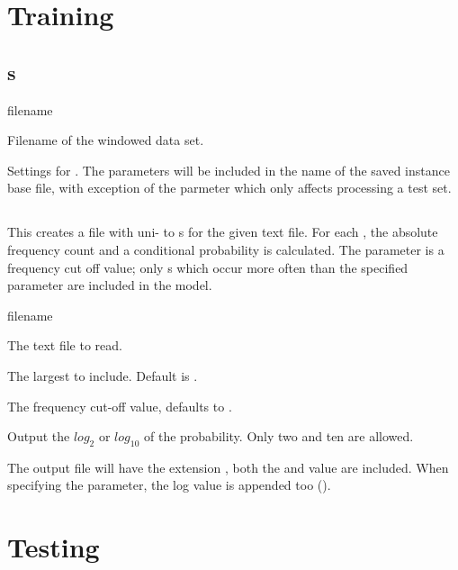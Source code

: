 \documentclass[a4paper,10pt,twoside]{report}
\begin{document}

\section{Training}

\subsection{s}

\begin{varlist}{filename}
\item[filename] Filename of the windowed data set.
\item[timbl] Settings for \Timbl{}. The parameters will be included in
  the name of the saved instance base file, with exception of the
   parmeter which only affects processing a test set.
\end{varlist}

\subsection{}

This creates a file with uni- to \ngram{}s for the given text
file. For each \ngram{}, the absolute frequency count and a
conditional probability is calculated. The  parameter is a
frequency cut off value; only \ngram{}s which occur more often than
the specified  parameter are included in the model.

\begin{varlist}{filename}
\item[filename] The text file to read.
\item[n] The largest \ngram{} to include. Default is .
\item[fco] The frequency cut-off value, defaults to .
\item[log] Output the $log_2$ or $log_{10}$ of the probability. Only
  two and ten are allowed.
\end{varlist}

The output file will have the extension , both the
 and  value are included. When specifying the
 parameter, the log value is appended too ().

\section{Testing}
\end{document}
